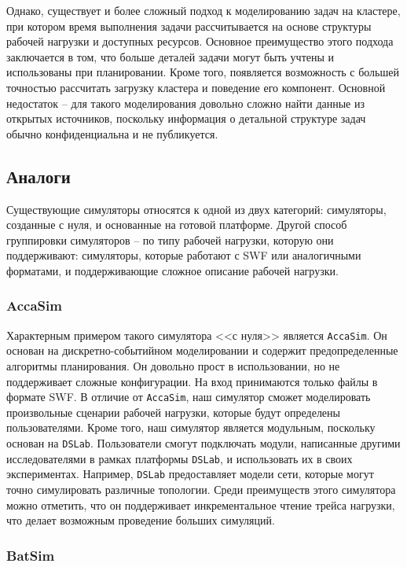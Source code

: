 Однако, существует и более сложный подход к моделированию задач на кластере, при котором время выполнения задачи рассчитывается на основе структуры рабочей нагрузки и доступных ресурсов. Основное преимущество этого подхода заключается в том, что больше деталей задачи могут быть учтены и использованы при планировании. Кроме того, появляется возможность с большей точностью рассчитать загрузку кластера и поведение его компонент. Основной недостаток -- для такого моделирования довольно сложно найти данные из открытых источников, поскольку информация о детальной структуре задач обычно конфиденциальна и не публикуется.

\subsection{Аналоги} 

Существующие симуляторы относятся к одной из двух категорий: симуляторы, созданные с нуля, и основанные на готовой платформе. Другой способ группировки симуляторов -- по типу рабочей нагрузки, которую они поддерживают: симуляторы, которые работают с SWF или аналогичными форматами, и поддерживающие сложное описание рабочей нагрузки.

\subsubsection{AccaSim}

Характерным примером такого симулятора <<с нуля>> является \texttt{AccaSim}\cite{accasim-article}. Он основан на дискретно-событийном моделировании и содержит предопределенные алгоритмы планирования. Он довольно прост в использовании, но не поддерживает сложные конфигурации. На вход принимаются только файлы в формате SWF. В отличие от \texttt{AccaSim}, наш симулятор сможет моделировать произвольные сценарии рабочей нагрузки, которые будут определены пользователями. Кроме того, наш симулятор является модульным, поскольку основан на \texttt{DSLab}. Пользователи смогут подключать модули, написанные другими исследователями в рамках платформы \texttt{DSLab}, и использовать их в своих экспериментах. Например, \texttt{DSLab} предоставляет модели сети, которые могут точно симулировать различные топологии. Среди преимуществ этого симулятора можно отметить, что он поддерживает инкрементальное чтение трейса нагрузки, что делает возможным проведение больших симуляций.

\subsubsection{BatSim}

